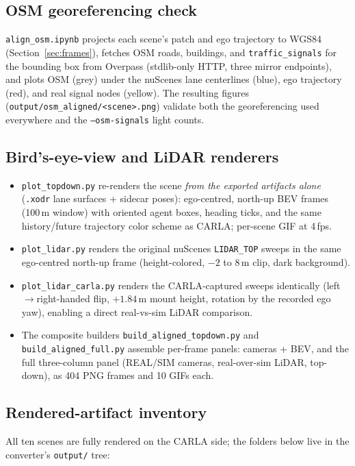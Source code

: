 \documentclass[11pt]{article}
\newcommand{\code}[1]{{\setlength{\fboxsep}{1.5pt}\colorbox{codegray}{\small\texttt{#1}}}}
\newcommand{\file}[1]{\texttt{#1}}
\begin{document}
\subsection{OSM georeferencing check}
\file{align\_osm.ipynb} projects each scene's patch and ego trajectory to WGS84
(Section~\ref{sec:frames}), fetches OSM roads, buildings, and \code{traffic\_signals}
for the bounding box from Overpass (stdlib-only HTTP, three mirror endpoints), and plots
OSM (grey) under the nuScenes lane centerlines (blue), ego trajectory (red), and real
signal nodes (yellow). The resulting figures
(\file{output/osm\_aligned/<scene>.png}) validate both the georeferencing used
everywhere and the \code{--osm-signals} light counts.

\subsection{Bird's-eye-view and LiDAR renderers}
\begin{itemize}
\item \file{plot\_topdown.py} re-renders the scene \emph{from the exported artifacts
      alone} (\file{.xodr} lane surfaces + sidecar poses): ego-centred, north-up BEV
      frames (100\,m window) with oriented agent boxes, heading ticks, and the same
      history/future trajectory color scheme as CARLA; per-scene GIF at 4\,fps.
\item \file{plot\_lidar.py} renders the original nuScenes \code{LIDAR\_TOP} sweeps in
      the same ego-centred north-up frame (height-colored, $-2$ to $8$\,m clip, dark
      background).
\item \file{plot\_lidar\_carla.py} renders the CARLA-captured sweeps identically
      (left$\rightarrow$right-handed flip, $+1.84$\,m mount height, rotation by the
      recorded ego yaw), enabling a direct real-vs-sim LiDAR comparison.
\item The composite builders \file{build\_aligned\_topdown.py} and
      \file{build\_aligned\_full.py} assemble per-frame panels: cameras + BEV, and the
      full three-column panel (REAL/SIM cameras, real-over-sim LiDAR, top-down), as
      404 PNG frames and 10 GIFs each.
\end{itemize}

\subsection{Rendered-artifact inventory}
All ten scenes are fully rendered on the CARLA side; the folders below live in the
converter's \file{output/} tree:
\end{document}
